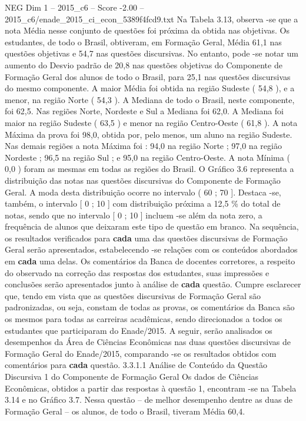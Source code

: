 \begin{textsample}{NEG Dim 1 – 2015\_c6 – Score -2.00 – 2015\_c6/enade\_2015\_ci\_econ\_5389f4fcd9.txt}
Na Tabela 3.13, observa -se que a nota Média nesse conjunto de questões foi próxima da obtida nas objetivas.
Os estudantes, de todo o Brasil, obtiveram, em Formação Geral, Média 61,1 nas questões objetivas e 54,7 nas questões discursivas.
No entanto, pode -se notar um aumento do Desvio padrão de 20,8 nas questões objetivas do Componente de Formação Geral dos alunos de todo o Brasil, para 25,1 nas questões discursivas do mesmo componente.
A maior Média foi obtida na região Sudeste ( 54,8 ), e a menor, na região Norte ( 54,3 ).
A Mediana de todo o Brasil, neste componente, foi 62,5.
Nas regiões Norte, Nordeste e Sul a Mediana foi 62,0.
A Mediana foi maior na região Sudeste ( 63,5 ) e menor na região Centro-Oeste ( 61,8 ).
A nota Máxima da prova foi 98,0, obtida por, pelo menos, um aluno na região Sudeste.
Nas demais regiões a nota Máxima foi : 94,0 na região Norte ; 97,0 na região Nordeste ; 96,5 na região Sul ; e 95,0 na região Centro-Oeste.
A nota Mínima ( 0,0 ) foram as mesmas em todas as regiões do Brasil.
O Gráfico 3.6 representa a distribuição das notas nas questões discursivas do Componente de Formação Geral.
A moda desta distribuição ocorre no intervalo ( 60 ; 70 ].
Destaca -se, também, o intervalo [ 0 ; 10 ] com distribuição próxima a 12,5 \% do total de notas, sendo que no intervalo [ 0 ; 10 ] incluem -se além da nota zero, a frequência de alunos que deixaram este tipo de questão em branco.
Na sequência, os resultados verificados para \textbf{cada} uma das questões discursivas de Formação Geral serão apresentados, estabelecendo -se relações com os conteúdos abordados em \textbf{cada} uma delas.
Os comentários da Banca de docentes corretores, a respeito do observado na correção das respostas dos estudantes, suas impressões e conclusões serão apresentados junto à análise de \textbf{cada} questão.
Cumpre esclarecer que, tendo em vista que as questões discursivas de Formação Geral são padronizadas, ou seja, constam de todas as provas, os comentários da Banca são os mesmos para todas as carreiras acadêmicas, sendo direcionados a todos os estudantes que participaram do Enade/2015.
A seguir, serão analisados os desempenhos da Área de Ciências Econômicas nas duas questões discursivas de Formação Geral do Enade/2015, comparando -se os resultados obtidos com comentários para \textbf{cada} questão. 3.3.1.1 Análise de Conteúdo da Questão Discursiva 1 do Componente de Formação Geral Os dados de Ciências Econômicas, obtidos a partir das respostas à questão 1, encontram -se na Tabela 3.14 e no Gráfico 3.7.
Nessa questão – de melhor desempenho dentre as duas de Formação Geral – os alunos, de todo o Brasil, tiveram Média 60,4.

\end{textsample}
